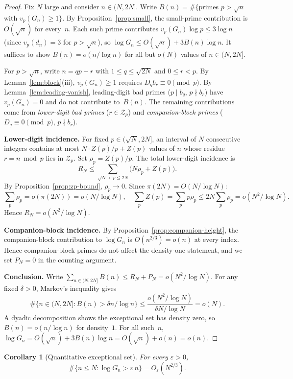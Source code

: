 \documentclass[11pt]{article}
\newtheorem{corollary}[theorem]{Corollary}
\theoremstyle{definition}
\theoremstyle{remark}
\begin{document}
\begin{proof}
Fix $N$ large and consider $n \in (N, 2N]$.
Write $B(n) = \#\{$primes $p > \sqrt{n}$
with $v_p(G_n) \ge 1\}$.
By Proposition~\ref{prop:small}, the small-prime
contribution is $O(\sqrt{n})$ for every~$n$.
Each such prime contributes $v_p(G_n)\log p \le 3\log n$
(since $v_p(d_n) = 3$ for $p > \sqrt{n}$),
so $\log G_n \le O(\sqrt{n}) + 3B(n)\log n$.
It suffices to show $B(n) = o(n/\log n)$
for all but $o(N)$ values of $n \in (N, 2N]$.

For $p > \sqrt{n}$, write $n = qp + r$
with $1 \le q \le \sqrt{2N}$ and $0 \le r < p$.
By Lemma~\ref{lem:block}(iii), $v_p(G_n) \ge 1$
requires $D_q b_r \equiv 0 \pmod{p}$.
By Lemma~\ref{lem:leading-vanish},
leading-digit bad primes ($p \mid b_q$, $p \nmid b_r$)
have $v_p(G_n) = 0$ and do not contribute to~$B(n)$.
The remaining contributions come from
\emph{lower-digit bad primes} ($r \in \mathcal{Z}_p$)
and \emph{companion-block primes}
($D_q \equiv 0 \pmod{p}$, $p \nmid b_r$).

\textbf{Lower-digit incidence.}
For fixed $p \in (\sqrt{N}, 2N]$, an interval of $N$
consecutive integers contains at most
$N\cdot Z(p)/p + Z(p)$ values of $n$ whose
residue $r = n \bmod p$ lies in $\mathcal{Z}_p$.
Set $\rho_p = Z(p)/p$. The total lower-digit incidence is
\[
R_N \le \sum_{\sqrt{N} < p \le 2N}
\bigl(N\rho_p + Z(p)\bigr).
\]
By Proposition~\ref{prop:zp-bound}, $\rho_p \to 0$.
Since $\pi(2N) = O(N/\log N)$:
\[
\sum_p \rho_p = o(\pi(2N)) = o(N/\log N),
\quad
\sum_p Z(p) = \sum_p p\rho_p \le 2N \sum_p \rho_p
= o(N^2/\log N).
\]
Hence $R_N = o(N^2/\log N)$.

\textbf{Companion-block incidence.}
By Proposition~\ref{prop:companion-height},
the companion-block contribution to $\log G_n$
is $O(n^{2/3}) = o(n)$ at every index.
Hence companion-block primes do not affect the
density-one statement, and we set $P_N = 0$
in the counting argument.

\textbf{Conclusion.}
Write $\sum_{n \in (N,2N]} B(n) \le R_N + P_N = o(N^2/\log N)$.
For any fixed $\delta > 0$, Markov's inequality gives
\[
\#\bigl\{n \in (N,2N] : B(n) > \delta n/\log n\bigr\}
\le \frac{o(N^2/\log N)}{\delta N/\log N} = o(N).
\]
A dyadic decomposition shows the exceptional set has
density zero, so $B(n) = o(n/\log n)$ for density~$1$.
For all such~$n$,
$\log G_n = O(\sqrt{n}) + 3B(n)\log n = O(\sqrt{n}) + o(n) = o(n)$.
\end{proof}

\begin{corollary}[Quantitative exceptional set]\label{cor:exceptional}
For every $\varepsilon > 0$,
\[
\#\{n \le N : \log G_n > \varepsilon\,n\}
= O_\varepsilon(N^{2/3}).
\]
\end{corollary}
\end{document}
